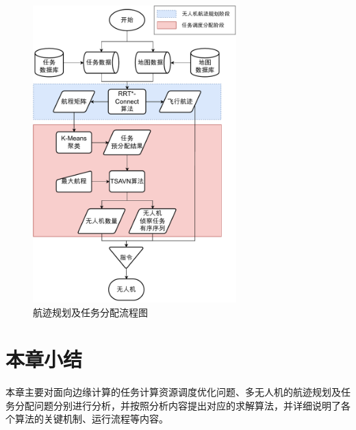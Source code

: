 \begin{figure}[!htbp]
    \centering
    \includegraphics[width=0.7\textwidth]{images/任务分配及航迹规划算法流程图.drawio.pdf}
    \caption{航迹规划及任务分配流程图}
    \label{fig:航迹规划及任务分配流程图}
\end{figure}

\newpage
\section{本章小结}

本章主要对面向边缘计算的任务计算资源调度优化问题、多无人机的航迹规划及任务分配问题分别进行分析，并按照分析内容提出对应的求解算法，并详细说明了各个算法的关键机制、运行流程等内容。

\newpage
